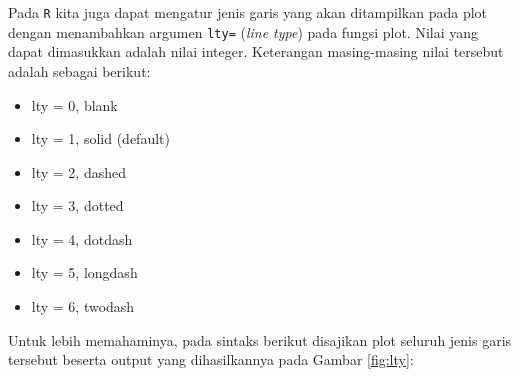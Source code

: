 \documentclass[
]{book}
\providecommand{\tightlist}{%
  \setlength{\itemsep}{0pt}\setlength{\parskip}{0pt}}
\theoremstyle{definition}
\theoremstyle{definition}
\theoremstyle{definition}
\theoremstyle{definition}
\theoremstyle{remark}
\begin{document}
Pada \texttt{R} kita juga dapat mengatur jenis garis yang akan ditampilkan pada plot dengan menambahkan argumen \texttt{lty=} (\emph{line type}) pada fungsi plot. Nilai yang dapat dimasukkan adalah nilai integer. Keterangan masing-masing nilai tersebut adalah sebagai berikut:

\begin{itemize}
\tightlist
\item
  lty = 0, blank
\item
  lty = 1, solid (default)
\item
  lty = 2, dashed
\item
  lty = 3, dotted
\item
  lty = 4, dotdash
\item
  lty = 5, longdash
\item
  lty = 6, twodash
\end{itemize}

Untuk lebih memahaminya, pada sintaks berikut disajikan plot seluruh jenis garis tersebut beserta output yang dihasilkannya pada Gambar \ref{fig:lty}:
\end{document}
